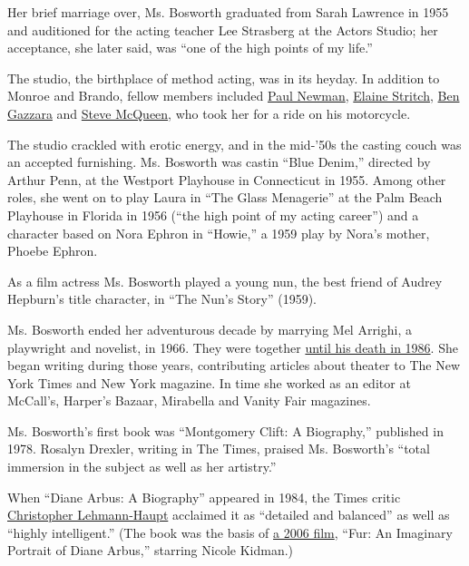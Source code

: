 Her brief marriage over, Ms. Bosworth graduated from Sarah Lawrence in
1955 and auditioned for the acting teacher Lee Strasberg at the Actors
Studio; her acceptance, she later said, was ``one of the high points of
my life.''

The studio, the birthplace of method acting, was in its heyday. In
addition to Monroe and Brando, fellow members included
\href{https://www.nytimes3xbfgragh.onion/2008/09/28/movies/28newman.html}{Paul
Newman},
\href{https://www.nytimes3xbfgragh.onion/2014/07/18/theater/elaine-stritch-tart-tongued-broadway-actress-and-singer-is-dead-at-89.html}{Elaine
Stritch},
\href{https://www.nytimes3xbfgragh.onion/2012/02/04/movies/ben-gazzara-actor-of-stage-and-screen-dies-at-81.html}{Ben
Gazzara} and
\href{https://www.nytimes3xbfgragh.onion/1980/11/08/archives/steve-mcqueen-50-is-dead-of-a-heart-attack-after-surgery-for-cancer.html}{Steve
McQueen}, who took her for a ride on his motorcycle.

The studio crackled with erotic energy, and in the mid-'50s the casting
couch was an accepted furnishing. Ms. Bosworth was castin ``Blue
Denim,'' directed by Arthur Penn, at the Westport Playhouse in
Connecticut in 1955. Among other roles, she went on to play Laura in
``The Glass Menagerie'' at the Palm Beach Playhouse in Florida in 1956
(``the high point of my acting career'') and a character based on Nora
Ephron in ``Howie,'' a 1959 play by Nora's mother, Phoebe Ephron.

As a film actress Ms. Bosworth played a young nun, the best friend of
Audrey Hepburn's title character, in ``The Nun's Story'' (1959).

Ms. Bosworth ended her adventurous decade by marrying Mel Arrighi, a
playwright and novelist, in 1966. They were together
\href{https://www.nytimes3xbfgragh.onion/1986/09/17/obituaries/mel-arrighi-52-playwright.html}{until
his death in 1986}. She began writing during those years, contributing
articles about theater to The New York Times and New York magazine. In
time she worked as an editor at McCall's, Harper's Bazaar, Mirabella and
Vanity Fair magazines.

Ms. Bosworth's first book was ``Montgomery Clift: A Biography,''
published in 1978. Rosalyn Drexler, writing in The Times, praised Ms.
Bosworth's ``total immersion in the subject as well as her artistry.''

When ``Diane Arbus: A Biography'' appeared in 1984, the Times critic
\href{https://www.nytimes3xbfgragh.onion/2018/11/07/obituaries/christopher-lehmann-haupt-dead.html}{Christopher
Lehmann-Haupt} acclaimed it as ``detailed and balanced'' as well as
``highly intelligent.'' (The book was the basis of
\href{https://www.nytimes3xbfgragh.onion/2006/11/10/movies/10fur.html}{a
2006 film}, ``Fur: An Imaginary Portrait of Diane Arbus,'' starring
Nicole Kidman.)

